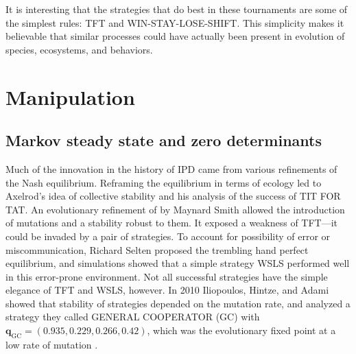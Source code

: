 It is interesting that the strategies that do best in these tournaments are some of the simplest rules: TFT and WIN-STAY-LOSE-SHIFT. This simplicity makes it believable that similar processes could have actually been present in evolution of species, ecosystems, and behaviors.






\chapter{Manipulation}

\section{Markov steady state and zero determinants}

Much of the innovation in the history of IPD came from various refinements of the Nash equilibrium. Reframing the equilibrium in terms of ecology led to Axelrod's idea of collective stability and his analysis of the success of TIT FOR TAT. An evolutionary refinement of by Maynard Smith allowed the introduction of mutations and a stability robust to them. It exposed a weakness of TFT---it could be invaded by a pair of strategies. To account for possibility of error or miscommunication, Richard Selten \cite{Selten_1975} proposed the trembling hand perfect equilibrium, and simulations showed that a simple strategy WSLS performed well in this error-prone environment. Not all successful strategies have the simple elegance of TFT and WSLS, however. In 2010 Iliopoulos, Hintze, and Adami showed that stability of strategies depended on the mutation rate, and analyzed a strategy they called GENERAL COOPERATOR (GC) with $\mathbf{q}_{\textrm{GC}} = (0.935, 0.229, 0.266, 0.42)$, which was the evolutionary fixed point at a low rate of mutation \cite{iliopoulos_2010}.

